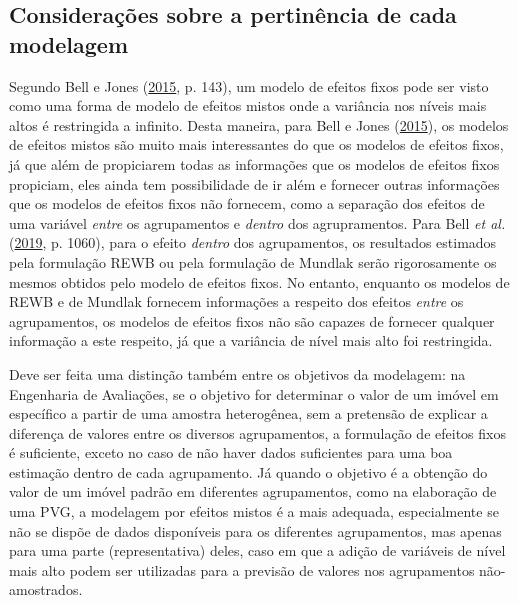 \documentclass[
  a4paper, 11pt]{article}
\begin{document}
\hypertarget{considerauxe7uxf5es-sobre-a-pertinuxeancia-de-cada-modelagem}{%
\subsection{Considerações sobre a pertinência de cada
modelagem}\label{considerauxe7uxf5es-sobre-a-pertinuxeancia-de-cada-modelagem}}

Segundo Bell e Jones (\protect\hyperlink{ref-bell2015}{2015}, p. 143),
um modelo de efeitos fixos pode ser visto como uma forma de modelo de
efeitos mistos onde a variância nos níveis mais altos é restringida a
infinito. Desta maneira, para Bell e Jones
(\protect\hyperlink{ref-bell2015}{2015}), os modelos de efeitos mistos
são muito mais interessantes do que os modelos de efeitos fixos, já que
além de propiciarem todas as informações que os modelos de efeitos fixos
propiciam, eles ainda tem possibilidade de ir além e fornecer outras
informações que os modelos de efeitos fixos não fornecem, como a
separação dos efeitos de uma variável \emph{entre} os agrupamentos e
\emph{dentro} dos agrupramentos. Para Bell \emph{et al.}
(\protect\hyperlink{ref-bell2019}{2019}, p. 1060), para o efeito
\emph{dentro} dos agrupamentos, os resultados estimados pela formulação
REWB ou pela formulação de Mundlak serão rigorosamente os mesmos obtidos
pelo modelo de efeitos fixos. No entanto, enquanto os modelos de REWB e
de Mundlak fornecem informações a respeito dos efeitos \emph{entre} os
agrupamentos, os modelos de efeitos fixos não são capazes de fornecer
qualquer informação a este respeito, já que a variância de nível mais
alto foi restringida.

Deve ser feita uma distinção também entre os objetivos da modelagem: na
Engenharia de Avaliações, se o objetivo for determinar o valor de um
imóvel em específico a partir de uma amostra heterogênea, sem a
pretensão de explicar a diferença de valores entre os diversos
agrupamentos, a formulação de efeitos fixos é suficiente, exceto no caso
de não haver dados suficientes para uma boa estimação dentro de cada
agrupamento. Já quando o objetivo é a obtenção do valor de um imóvel
padrão em diferentes agrupamentos, como na elaboração de uma PVG, a
modelagem por efeitos mistos é a mais adequada, especialmente se não se
dispõe de dados disponíveis para os diferentes agrupamentos, mas apenas
para uma parte (representativa) deles, caso em que a adição de variáveis
de nível mais alto podem ser utilizadas para a previsão de valores nos
agrupamentos não-amostrados.
\end{document}

